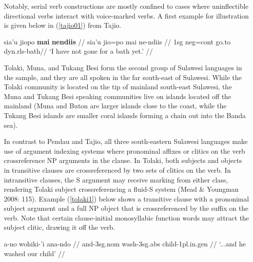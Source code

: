 Notably, serial verb constructions are mostly confined to cases where uninflectible directional verbs interact with voice-marked verbs. A first example for illustration is given below in (\ref{tajio01}) from Tajio.

\ex \label{tajio01}
\begingl
\gla sia’u jiopo \textbf{mai} \textbf{nendiis} // 
\glb sia’u jio=po mai ne-ndiis //
\glc \acs{1}\acs{sg} \acs{neg}=\acs{cont} go.to \acs{dyn}.\acs{rls}-bath//
\glft ‘I have not gone for a bath yet.’ // 
\endgl
\xe

Tolaki, Muna, and Tukang Besi form the second group of Sulawesi languages in the sample, and they are all spoken in the far south-east of Sulawesi. While the Tolaki community is located on the tip of mainland south-east Sulawesi, the Muna and Tukang Besi speaking communities live on islands located off the mainland (Muna and Buton are larger islands close to the coast, while the Tukang Besi islands are smaller coral islands forming a chain out into the Banda sea). 

In contrast to Pendau and Tajio, all three south-eastern Sulawesi languages make use of argument indexing systems where pronominal affixes or clitics on the verb crossreference NP arguments in the clause. In Tolaki, both subjects and objects in transitive clauses are crossreferenced by two sets of clitics on the verb. In intransitive clauses, the S argument may receive marking from either class, rendering Tolaki subject crossreferencing a fluid-S system (Mead \& Youngman 2008: 115). Example (\ref{tolaki1}) below shows a transitive clause with a prononimal subject argument and a full NP object that is crossreferenced by the suffix on the verb. Note that certain clause-initial monosyllabic function words may attract the subject clitic, drawing it off the verb.

\ex \label{tolaki1}
\begingl
\gla a-no wohiki-'i ana-ndo // 
\glb and-\acs{3}\acs{sg}.\acs{nom} wash-\acs{3}\acs{sg}.\acs{abs} child-\acs{1}\acs{pl}.\acs{in}.\acs{gen} //
\glft `...and he washed our child'  // 
\endgl
\xe

